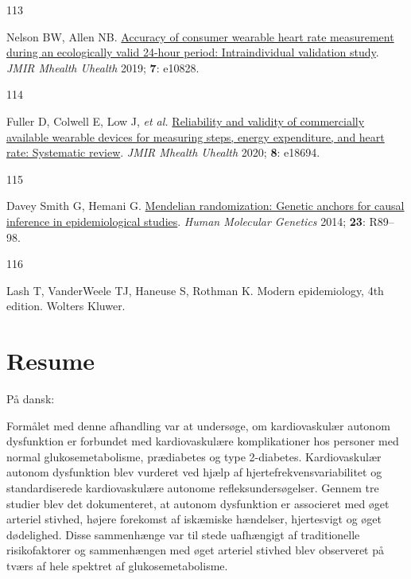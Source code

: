 \documentclass[
  a4paper,
  headsepline=true,
  open=any]{scrbook}
\newlength{\cslhangindent}
\newlength{\csllabelwidth}
\newlength{\cslentryspacingunit} %
\newenvironment{CSLReferences}[2] %
 {%
  \setlength{\parindent}{0pt}
  \ifodd #1
  \let\oldpar\par
  \def\par{\hangindent=\cslhangindent\oldpar}
  \fi
  \setlength{\parskip}{#2\cslentryspacingunit}
 }%
 {}
\newcommand{\CSLLeftMargin}[1]{\parbox[t]{\csllabelwidth}{#1}}
\newcommand{\CSLRightInline}[1]{\parbox[t]{\linewidth - \csllabelwidth}{#1}\break}
\begin{document}
\begin{CSLReferences}{0}{0}
\leavevmode{}%
\CSLLeftMargin{113 }%
\CSLRightInline{Nelson BW, Allen NB.
\href{https://doi.org/10.2196/10828}{Accuracy of consumer wearable heart
rate measurement during an ecologically valid 24-hour period:
Intraindividual validation study}. \emph{JMIR Mhealth Uhealth} 2019;
\textbf{7}: e10828.}

\leavevmode{}%
\CSLLeftMargin{114 }%
\CSLRightInline{Fuller D, Colwell E, Low J, \emph{et al.}
\href{https://doi.org/10.2196/18694}{Reliability and validity of
commercially available wearable devices for measuring steps, energy
expenditure, and heart rate: Systematic review}. \emph{JMIR Mhealth
Uhealth} 2020; \textbf{8}: e18694.}

\leavevmode{}%
\CSLLeftMargin{115 }%
\CSLRightInline{Davey Smith G, Hemani G.
\href{https://doi.org/10.1093/hmg/ddu328}{Mendelian randomization:
Genetic anchors for causal inference in epidemiological studies}.
\emph{Human Molecular Genetics} 2014; \textbf{23}: R89--98.}

\leavevmode{}%
\CSLLeftMargin{116 }%
\CSLRightInline{Lash T, VanderWeele TJ, Haneuse S, Rothman K. Modern
epidemiology, 4th edition. Wolters Kluwer.}

\end{CSLReferences}


\hypertarget{resume-1}{%
\chapter*{Resume}\label{resume-1}}


På dansk:

Formålet med denne afhandling var at undersøge, om kardiovaskulær
autonom dysfunktion er forbundet med kardiovaskulære komplikationer hos
personer med normal glukosemetabolisme, prædiabetes og type 2-diabetes.
Kardiovaskulær autonom dysfunktion blev vurderet ved hjælp af
hjertefrekvensvariabilitet og standardiserede kardiovaskulære autonome
refleksundersøgelser. Gennem tre studier blev det dokumenteret, at
autonom dysfunktion er associeret med øget arteriel stivhed, højere
forekomst af iskæmiske hændelser, hjertesvigt og øget dødelighed. Disse
sammenhænge var til stede uafhængigt af traditionelle risikofaktorer og
sammenhængen med øget arteriel stivhed blev observeret på tværs af hele
spektret af glukosemetabolisme.
\end{document}
